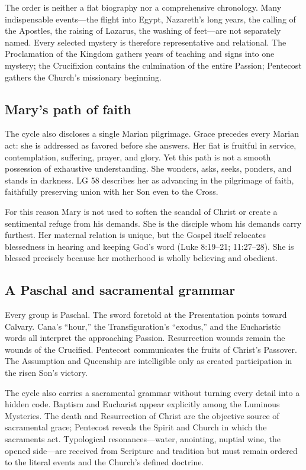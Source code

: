 The order is neither a flat biography nor a comprehensive chronology. Many indispensable events---the flight into Egypt, Nazareth's long years, the calling of the Apostles, the raising of Lazarus, the washing of feet---are not separately named. Every selected mystery is therefore representative and relational. The Proclamation of the Kingdom gathers years of teaching and signs into one mystery; the Crucifixion contains the culmination of the entire Passion; Pentecost gathers the Church's missionary beginning.

\subsection{Mary's path of faith}

The cycle also discloses a single Marian pilgrimage. Grace precedes every Marian act: she is addressed as favored before she answers. Her fiat is fruitful in service, contemplation, suffering, prayer, and glory. Yet this path is not a smooth possession of exhaustive understanding. She wonders, asks, seeks, ponders, and stands in darkness. LG 58 describes her as advancing in the pilgrimage of faith, faithfully preserving union with her Son even to the Cross.

For this reason Mary is not used to soften the scandal of Christ or create a sentimental refuge from his demands. She is the disciple whom his demands carry furthest. Her maternal relation is unique, but the Gospel itself relocates blessedness in hearing and keeping God's word (Luke 8:19--21; 11:27--28). She is blessed precisely because her motherhood is wholly believing and obedient.

\subsection{A Paschal and sacramental grammar}

Every group is Paschal. The sword foretold at the Presentation points toward Calvary. Cana's ``hour,'' the Transfiguration's ``exodus,'' and the Eucharistic words all interpret the approaching Passion. Resurrection wounds remain the wounds of the Crucified. Pentecost communicates the fruits of Christ's Passover. The Assumption and Queenship are intelligible only as created participation in the risen Son's victory.

The cycle also carries a sacramental grammar without turning every detail into a hidden code. Baptism and Eucharist appear explicitly among the Luminous Mysteries. The death and Resurrection of Christ are the objective source of sacramental grace; Pentecost reveals the Spirit and Church in which the sacraments act. Typological resonances---water, anointing, nuptial wine, the opened side---are received from Scripture and tradition but must remain ordered to the literal events and the Church's defined doctrine.

